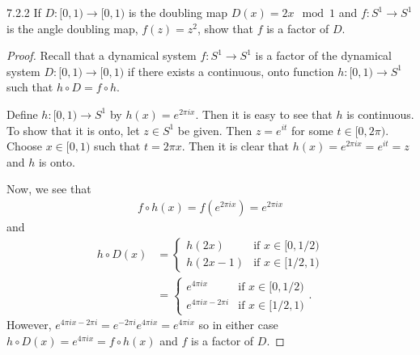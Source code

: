 \begin{problem}{7.2.2}
  If $D: [0, 1) \to [0, 1)$ is the doubling map $D(x) = 2x \mod 1$ and
  $f: S^1 \to S^1$ is the angle doubling map, $f(z) = z^2$, show that $f$ is a factor of $D$.
\end{problem}

\begin{proof}
  Recall that a dynamical system $f: S^1 \to S^1$ is a factor of the dynamical
  system $D:[0, 1) \to [0, 1)$ if there exists a continuous, onto function
  $h:[0,1) \to S^1$ such that $h \circ D = f \circ h$.

  Define $h:[0,1) \to S^1$ by $h(x) = e^{2\pi i x}$. Then it is easy to see that
  $h$ is continuous. To show that it is onto, let $z \in S^1$ be given. Then
  $z = e^{it}$ for some $t\in [0, 2\pi)$. Choose $x\in [0, 1)$ such that
  $t = 2\pi x$. Then it is clear that $h(x) = e^{2\pi i x} = e^{i t} = z$
  and $h$ is onto.

  Now, we see that
  \begin{align*}
    f \circ h(x) = f(e^{2\pi i x}) = e^{2\pi i x}
  \end{align*}
  and
  \begin{align*}
    h \circ D(x) &=
    \begin{cases}
      h(2x) & \text{if $x \in [0, 1/2)$}\\
      h(2x - 1) & \text{if $x \in [1/2, 1)$}
    \end{cases}\\
    &= \begin{cases}
      e^{4\pi i x} & \text{if $x \in [0, 1/2)$}\\
      e^{4\pi i x - 2\pi i } & \text{if $x \in [1/2, 1)$}
    \end{cases}.
  \end{align*}
  However, $e^{4\pi i x - 2\pi i } = e^{- 2\pi i }e^{4\pi i x} = e^{4\pi i x}$
  so in either case $h \circ D(x) = e^{4\pi i x} = f \circ h(x)$ and $f$ is a factor of $D$.

\end{proof}
\newpage
